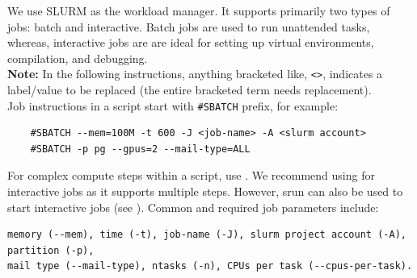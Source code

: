 %
We use SLURM as the workload manager.
It supports primarily two types of jobs: batch and interactive.
Batch jobs are used to run unattended tasks, whereas, 
interactive jobs are are ideal for setting up virtual environments, compilation, and debugging.\\
%
\noindent \textbf{Note:} In the following instructions, anything bracketed like, \verb+<>+, indicates a
label/value to be replaced (the entire bracketed term needs replacement).\\

\noindent Job instructions in a script start with \verb+#SBATCH+ prefix, for example:
\begin{verbatim}
    #SBATCH --mem=100M -t 600 -J <job-name> -A <slurm account>
    #SBATCH -p pg --gpus=2 --mail-type=ALL
\end{verbatim}
%
For complex compute steps within a script, use . We recommend using  for interactive jobs as it supports multiple steps.
However, srun can also be used to start interactive jobs (see ).
%
Common and required job parameters include:
\begin{verbatim}
memory (--mem), time (-t), job-name (-J), slurm project account (-A), partition (-p), 
mail type (--mail-type), ntasks (-n), CPUs per task (--cpus-per-task).
\end{verbatim}